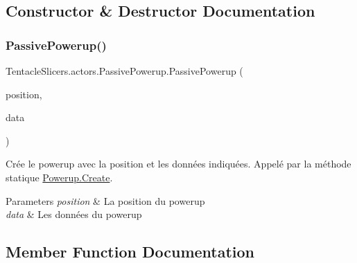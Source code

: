 \subsection{Constructor \& Destructor Documentation}
\mbox{\label{class_tentacle_slicers_1_1actors_1_1_passive_powerup_a36c2f04ef2b3bd32b71f0c866774e995}} 
\subsubsection{\texorpdfstring{Passive\+Powerup()}{PassivePowerup()}}
{\footnotesize\ttfamily Tentacle\+Slicers.\+actors.\+Passive\+Powerup.\+Passive\+Powerup (\begin{DoxyParamCaption}\item[{\hyperlink{class_tentacle_slicers_1_1general_1_1_point}{Point}}]{position,  }\item[{\hyperlink{class_tentacle_slicers_1_1actors_1_1_powerup_data}{Powerup\+Data}}]{data }\end{DoxyParamCaption})}



Crée le powerup avec la position et les données indiquées. Appelé par la méthode statique \hyperlink{class_tentacle_slicers_1_1actors_1_1_powerup_a170bfc9101d384a73957470249458cfc}{Powerup.\+Create}. 


\begin{DoxyParams}{Parameters}
{\em position} & La position du powerup \\
\hline
{\em data} & Les données du powerup \\
\hline
\end{DoxyParams}


\subsection{Member Function Documentation}
\mbox{\label{class_tentacle_slicers_1_1actors_1_1_passive_powerup_a73aed325e29e372952cf46add5377b57}} 
